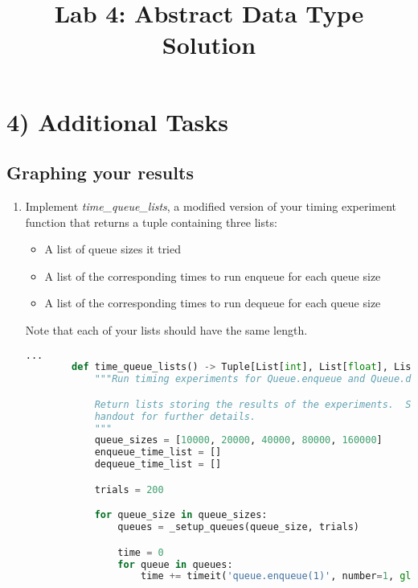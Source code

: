 \documentclass[12pt]{article}
\begin{document}
\title{Lab 4: Abstract Data Type Solution}
\date{}
\maketitle

\section*{4) Additional Tasks}
\subsection*{Graphing your results}
\begin{enumerate}[1.]
    \item Implement \textit{time\_queue\_lists}, a modified version of your timing
    experiment function that returns a tuple containing three lists:

    \begin{itemize}
        \item A list of queue sizes it tried
        \item A list of the corresponding times to run enqueue for each queue size
        \item A list of the corresponding times to run dequeue for each queue size
    \end{itemize}

    \bigskip

    Note that each of your lists should have the same length.

    \bigskip

    \begin{mdframed}
        \begin{lstlisting}[language=Python,caption={task\_4\_q1\_solution.py},captionpos=b]
        ...
        def time_queue_lists() -> Tuple[List[int], List[float], List[float]]:
            """Run timing experiments for Queue.enqueue and Queue.dequeue.

            Return lists storing the results of the experiments.  See the lab
            handout for further details.
            """
            queue_sizes = [10000, 20000, 40000, 80000, 160000]
            enqueue_time_list = []
            dequeue_time_list = []

            trials = 200

            for queue_size in queue_sizes:
                queues = _setup_queues(queue_size, trials)

                time = 0
                for queue in queues:
                    time += timeit('queue.enqueue(1)', number=1, globals=locals())


\end{lstlisting}
\end{mdframed}
\end{enumerate}
\end{document}
